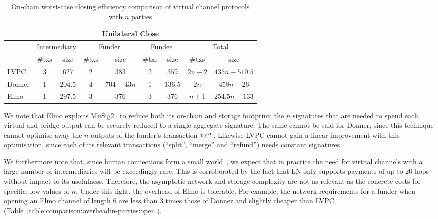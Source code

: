   \addtolength{\intextsep}{-25pt}
  \begin{table}[h!]
    \begin{minipage}{\textwidth}
    \centering
    \begin{tabular}{|l|c|c|c|c|c|c|c|c|}
    \hline
    \multicolumn{9}{|c|}{Unilateral Close} \\
    \hline
              & \multicolumn{2}{|c|}{Intermediary}
              & \multicolumn{2}{|c|}{Funder} & \multicolumn{2}{|c|}{Fundee}
              & \multicolumn{2}{|c|}{Total} \\
    \hline
              & \#txs & size & \#txs & size & \#txs & size & \#txs & size \\
    \hline
    LVPC      & $3$ & $627$ & $2$ & $383$ & $2$ & $359$ & $2n-2$ & $435n -
              510.5$ \\
    \hline
    Donner    & $1$ & $204.5$ & $4$ & $704 + 43n$ & $1$ & $136.5$ & $2n$ & $458n
              - 26$ \\
    \hline
    Elmo      & $1$ & $297.5$ & $3$ & $376$ & $3$ & $376$
              & $n+1$ & $254.5n-133$ \\
    \hline
    \end{tabular}
    \end{minipage}
    \caption{On-chain worst-case closing efficiency comparison of virtual
    channel protocols with $n$ parties}
    \label{table:comparison:overhead:n-parties:close}
  \end{table}
  \addtolength{\intextsep}{25pt}

  We note that Elmo exploits
  MuSig2~\cite{DBLP:journals/dcc/MaxwellPSW19,DBLP:conf/crypto/NickRS21} to
  reduce both its
  on-chain and storage footprint: the $n$ signatures that are needed to spend
  each virtual and bridge output can be securely reduced to a single aggregate
  signature. The same cannot be said for
  Donner, since this technique cannot optimise away the $n$ outputs of the
  funder's transaction $\texttt{tx}^{\mathtt{vc}}$. Likewise LVPC cannot gain a linear
  improvement with this optimisation, since each of its relevant transactions
  (``split'', ``merge'' and ``refund'') needs constant signatures.

  We furthermore note that, since human connections form a
  small world~\cite{smallworld}, we expect that in practice the
  need for virtual channels with a large number of
  intermediaries will be exceedingly rare. This is corroborated by
  the fact that LN only supports payments of up to $20$ hops
  without impact to its usefulness. Therefore, the asymptotic
  network and storage complexity are not as relevant as the
  concrete costs for specific, low values of $n$. Under this
  light, the overhead of Elmo is tolerable. For example, the
  network requirements for a funder when opening an Elmo channel
  of length $6$ are less than $3$ times those of Donner and
  slightly cheaper than LVPC
  (Table~\ref{table:comparison:overhead:n-parties:open}).

